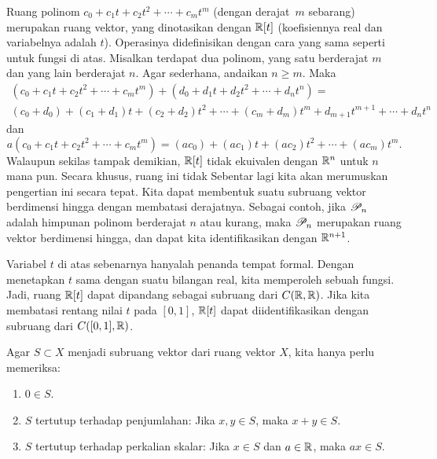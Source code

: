 \begin{example}
Ruang polinom $c_0 + c_1 t + c_2 t^2 + \cdots + c_m t^m$
(dengan derajat~$m$ sebarang) merupakan ruang vektor,
yang dinotasikan dengan ${\mathbb{R}}[t]$ (koefisiennya real dan
variabelnya adalah $t$).  Operasinya didefinisikan dengan cara yang sama seperti untuk
fungsi di atas.
Misalkan terdapat
dua polinom, yang satu berderajat $m$ dan yang lain berderajat $n$.  Agar sederhana, andaikan $n
\geq m$.  Maka
\begin{multline*}
(c_0 + c_1 t + c_2 t^2 + \cdots + c_m t^m)
+
(d_0 + d_1 t + d_2 t^2 + \cdots + d_n t^n)
= \\
(c_0+d_0) + (c_1+d_1) t + (c_2 + d_2) t^2 + \cdots + (c_m+d_m) t^m
+ d_{m+1} t^{m+1} + \cdots + d_n t^n
\end{multline*}
dan
\begin{equation*}
a(c_0 + c_1 t + c_2 t^2 + \cdots + c_m t^m)
=
(ac_0) + (ac_1) t + (ac_2) t^2 + \cdots + (ac_m) t^m  .
\end{equation*}
Walaupun sekilas tampak demikian, ${\mathbb{R}}[t]$ tidak ekuivalen dengan ${\mathbb{R}}^n$ untuk $n$ mana pun.
Secara khusus, ruang ini tidak   Sebentar lagi kita akan merumuskan
pengertian ini secara tepat.  Kita dapat membentuk suatu
subruang vektor berdimensi hingga dengan membatasi derajatnya.  Sebagai contoh,
jika ${\mathscr{P}}_n$ adalah himpunan polinom berderajat $n$ atau kurang,
maka ${\mathscr{P}}_n$ merupakan ruang vektor berdimensi hingga, dan dapat kita
identifikasikan dengan ${\mathbb{R}}^{n+1}$.

Variabel $t$ di atas sebenarnya hanyalah penanda tempat formal.
Dengan menetapkan $t$ sama dengan suatu bilangan real, kita memperoleh sebuah fungsi.
Jadi, ruang ${\mathbb{R}}[t]$ dapat dipandang sebagai subruang dari $C({\mathbb{R}},{\mathbb{R}})$.
Jika kita membatasi rentang nilai $t$ pada $[0,1]$, ${\mathbb{R}}[t]$ dapat diidentifikasikan dengan
subruang dari $C([0,1],{\mathbb{R}})$.
\end{example}

\begin{prop}
Agar $S \subset X$ menjadi subruang vektor
dari ruang vektor $X$, kita hanya perlu memeriksa:
\begin{enumerate}[1)]
\item
$0 \in S$.
\item
$S$ tertutup terhadap penjumlahan: Jika $x,y \in S$, maka $x+y \in S$.
\item
$S$ tertutup terhadap perkalian skalar:
Jika $x \in S$ dan $a \in {\mathbb{R}}$, maka $ax \in S$.
\end{enumerate}
\end{prop}

